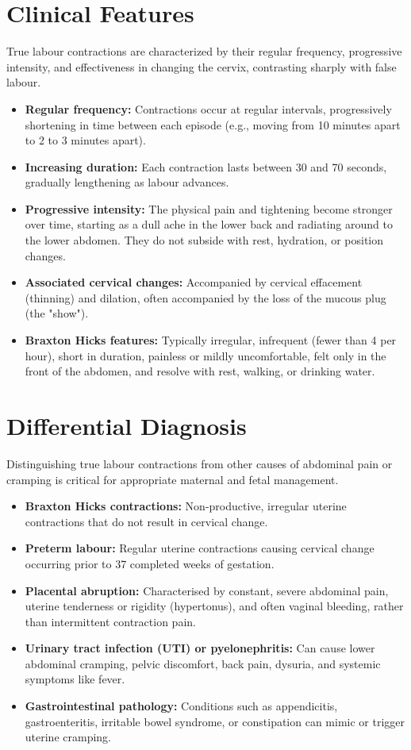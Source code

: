 \section*{Clinical Features}
True labour contractions are characterized by their regular frequency, progressive intensity, and effectiveness in changing the cervix, contrasting sharply with false labour.
\begin{itemize}
    \item \textbf{Regular frequency:} Contractions occur at regular intervals, progressively shortening in time between each episode (e.g., moving from 10 minutes apart to 2 to 3 minutes apart).
    \item \textbf{Increasing duration:} Each contraction lasts between 30 and 70 seconds, gradually lengthening as labour advances.
    \item \textbf{Progressive intensity:} The physical pain and tightening become stronger over time, starting as a dull ache in the lower back and radiating around to the lower abdomen. They do not subside with rest, hydration, or position changes.
    \item \textbf{Associated cervical changes:} Accompanied by cervical effacement (thinning) and dilation, often accompanied by the loss of the mucous plug (the "show").
    \item \textbf{Braxton Hicks features:} Typically irregular, infrequent (fewer than 4 per hour), short in duration, painless or mildly uncomfortable, felt only in the front of the abdomen, and resolve with rest, walking, or drinking water.
\end{itemize}

\section*{Differential Diagnosis}
Distinguishing true labour contractions from other causes of abdominal pain or cramping is critical for appropriate maternal and fetal management.
\begin{itemize}
    \item \textbf{Braxton Hicks contractions:} Non-productive, irregular uterine contractions that do not result in cervical change.
    \item \textbf{Preterm labour:} Regular uterine contractions causing cervical change occurring prior to 37 completed weeks of gestation.
    \item \textbf{Placental abruption:} Characterised by constant, severe abdominal pain, uterine tenderness or rigidity (hypertonus), and often vaginal bleeding, rather than intermittent contraction pain.
    \item \textbf{Urinary tract infection (UTI) or pyelonephritis:} Can cause lower abdominal cramping, pelvic discomfort, back pain, dysuria, and systemic symptoms like fever.
    \item \textbf{Gastrointestinal pathology:} Conditions such as appendicitis, gastroenteritis, irritable bowel syndrome, or constipation can mimic or trigger uterine cramping.
\end{itemize}

